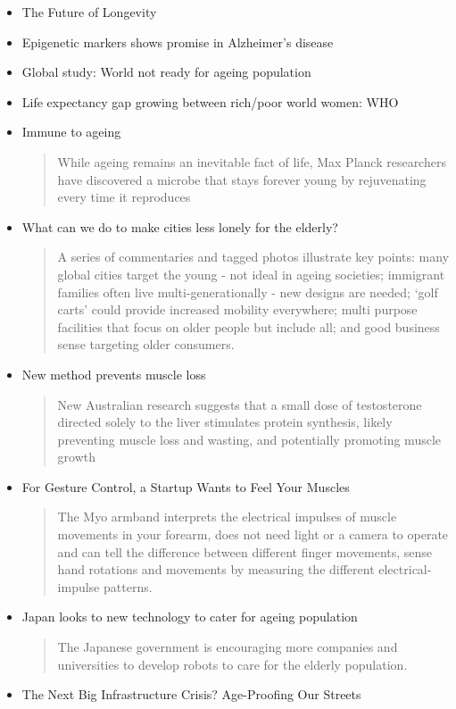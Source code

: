 \begin{itemize}
\item The Future of Longevity
\item Epigenetic markers shows promise in Alzheimer's disease
\item Global study: World not ready for ageing population
\item Life expectancy gap growing between rich/poor world women: WHO
\item Immune to ageing
\begin{quotation}
While ageing remains an inevitable fact of life, Max Planck researchers have discovered a microbe that stays forever young by rejuvenating every time it reproduces\end{quotation}
\item What can we do to make cities less lonely for the elderly?
\begin{quotation}
A series of commentaries and tagged photos illustrate key points: many global cities target the young - not ideal in ageing societies; immigrant families often live multi-generationally - new designs are needed; `golf carts' could provide increased mobility everywhere; multi purpose facilities that focus on older people but include all; and good business sense targeting older consumers.\end{quotation}
\item New method prevents muscle loss
\begin{quotation}
New Australian research suggests that a small dose of testosterone directed solely to the liver stimulates protein synthesis, likely preventing muscle loss and wasting, and potentially promoting muscle growth\end{quotation}
\item For Gesture Control, a Startup Wants to Feel Your Muscles
\begin{quotation}
The  Myo armband interprets the electrical impulses of muscle movements in your forearm, does not need light or a camera to operate and can tell the difference between different finger movements, sense hand rotations and movements by measuring the different electrical-impulse patterns.\end{quotation}
\item Japan looks to new technology to cater for ageing population
\begin{quotation}
The Japanese government is encouraging more companies and universities to develop robots to care for the elderly population.\end{quotation}
\item The Next Big Infrastructure Crisis? Age-Proofing Our Streets

\end{itemize}

